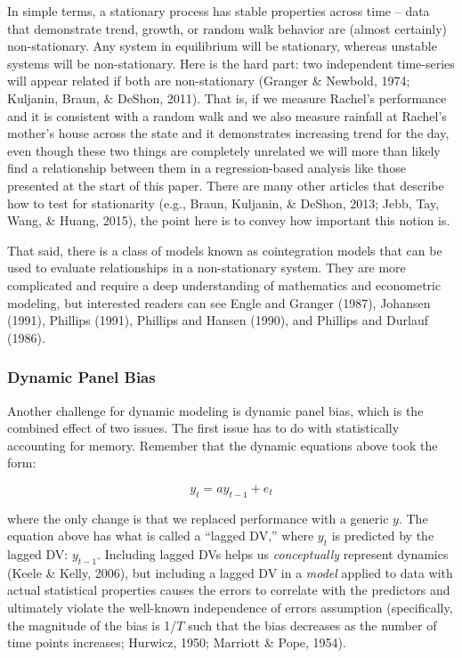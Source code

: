 \documentclass[english,,man]{apa6}
\theoremstyle{definition}
\theoremstyle{definition}
\theoremstyle{definition}
\theoremstyle{remark}
\begin{document}
In simple terms, a stationary process has stable properties across time
-- data that demonstrate trend, growth, or random walk behavior are
(almost certainly) non-stationary. Any system in equilibrium will be
stationary, whereas unstable systems will be non-stationary. Here is the
hard part: two independent time-series will appear related if both are
non-stationary (Granger \& Newbold, 1974; Kuljanin, Braun, \& DeShon,
2011). That is, if we measure Rachel's performance and it is consistent
with a random walk and we also measure rainfall at Rachel's mother's
house across the state and it demonstrates increasing trend for the day,
even though these two things are completely unrelated we will more than
likely find a relationship between them in a regression-based analysis
like those presented at the start of this paper. There are many other
articles that describe how to test for stationarity (e.g., Braun,
Kuljanin, \& DeShon, 2013; Jebb, Tay, Wang, \& Huang, 2015), the point
here is to convey how important this notion is.

That said, there is a class of models known as cointegration models that
can be used to evaluate relationships in a non-stationary system. They
are more complicated and require a deep understanding of mathematics and
econometric modeling, but interested readers can see Engle and Granger
(1987), Johansen (1991), Phillips (1991), Phillips and Hansen (1990),
and Phillips and Durlauf (1986).

\hypertarget{dynamic-panel-bias}{%
\subsubsection{Dynamic Panel Bias}\label{dynamic-panel-bias}}

Another challenge for dynamic modeling is dynamic panel bias, which is
the combined effect of two issues. The first issue has to do with
statistically accounting for memory. Remember that the dynamic equations
above took the form:

\begin{equation}
y_{t} = a y_{t-1} + e_{t}
\end{equation}

\noindent where the only change is that we replaced performance with a
generic \(y\). The equation above has what is called a \enquote{lagged
DV,} where \(y_{t}\) is predicted by the lagged DV: \(y_{t-1}\).
Including lagged DVs helps us \emph{conceptually} represent dynamics
(Keele \& Kelly, 2006), but including a lagged DV in a \emph{model}
applied to data with actual statistical properties causes the errors to
correlate with the predictors and ultimately violate the well-known
independence of errors assumption (specifically, the magnitude of the
bias is 1/\(T\) such that the bias decreases as the number of time
points increases; Hurwicz, 1950; Marriott \& Pope, 1954).
\end{document}

